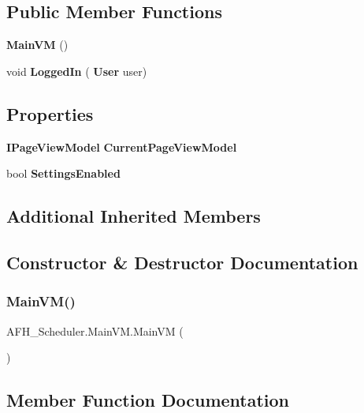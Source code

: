 \subsection*{Public Member Functions}
\begin{DoxyCompactItemize}
\item 
\textbf{ Main\+VM} ()
\item 
void \textbf{ Logged\+In} (\textbf{ User} user)
\end{DoxyCompactItemize}
\subsection*{Properties}
\begin{DoxyCompactItemize}
\item 
\textbf{ I\+Page\+View\+Model} \textbf{ Current\+Page\+View\+Model}\hspace{0.3cm}{\ttfamily  [get, set]}
\item 
bool \textbf{ Settings\+Enabled}\hspace{0.3cm}{\ttfamily  [get, set]}
\end{DoxyCompactItemize}
\subsection*{Additional Inherited Members}


\subsection{Constructor \& Destructor Documentation}
\mbox{\label{class_a_f_h___scheduler_1_1_main_v_m_a3b4c4218bbbc07b68bae211bd783857b}} 
\subsubsection{MainVM()}
{\footnotesize\ttfamily A\+F\+H\+\_\+\+Scheduler.\+Main\+V\+M.\+Main\+VM (\begin{DoxyParamCaption}{ }\end{DoxyParamCaption})}



\subsection{Member Function Documentation}
\mbox{\label{class_a_f_h___scheduler_1_1_main_v_m_add1ae29ee4eb0e34ff9ebc1326617e8d}} 
